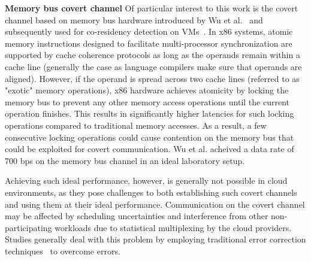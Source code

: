 \noindent \textbf{Memory bus covert channel} 
Of particular interest to this work is the covert channel based on memory bus
hardware introduced by Wu et al.~\cite{wuusenix2012} and subsequently used for
co-residency detection on VMs~\cite{varad191016}. In x86 systems, atomic
memory instructions designed to facilitate multi-processor synchronization are
supported by cache coherence protocols as long as the operands remain within a
cache line (generally the case as language compilers make sure that operands are
aligned). However, if the operand is spread across two cache lines (referred to
as "exotic" memory operations), x86 hardware achieves atomicity by locking the
memory bus to prevent any other memory access operations until the current
operation finishes. This results in significantly higher latencies for such
locking operations compared to traditional memory accesses. As a result, a few
consecutive locking operations could cause contention on the memory bus that
could be exploited for covert communication.  Wu et al. acheived a data rate of
700 bps on the memory bus channel in an ideal laboratory setup.


Achieving such ideal performance, however, is generally not possible in cloud
environments, as they pose challenges to both establishing such covert channels
and using them at their ideal performance. 
Communication on the covert channel may be affected by scheduling uncertainties
and interference from other non-participating workloads due to statistical
multiplexing by the cloud providers.  Studies generally deal with this problem
by employing traditional error correction techniques~\cite{wuusenix2012} to
overcome errors. 



